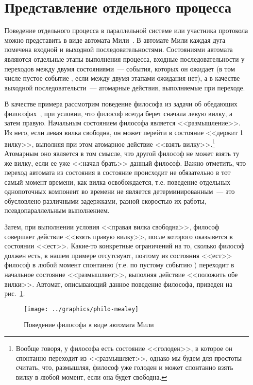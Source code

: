 \section{Представление отдельного процесса}
\label{sec:mealey-formalization}

Поведение отдельного процесса в параллельной системе или участника протокола можно
представить в виде автомата Мили~\cite{Velder}. В автомате Мили каждая дуга помечена
входной и выходной последовательностями. Состояниями автомата являются отдельные этапы
выполнения процесса, входные последовательности у переходов между двумя состояниями~---
события, которых он ожидает (в том числе пустое событие , если между двумя
этапами ожидания нет), а в качестве выходной последовательсти~--- атомарные действия,
выполняемые при переходе.

В качестве примера рассмотрим поведение философа из задачи об обедающих
философах~\cite{Dijkstra}, при условии, что философ всегда берет сначала левую вилку, а
затем правую. Начальным состоянием философа является <<размышление>>. Из него, если левая
вилка свободна, он может перейти в состояние <<держит 1 вилку>>, выполняя при этом
атомарное действие <<взять вилку>>.\footnote{Вообще говоря, у философа есть состояние
  <<голоден>>, в которое он спонтанно переходит из <<размышляет>>, однако мы будем для
  простоты считать, что, размышляя, философ уже голоден и может спонтанно взять вилку в
  любой момент, если она будет свободна.} Атомарным оно является в том смысле, что другой
философ не может взять ту же вилку, если ее уже <<начал брать>> данный философ. Важно
отметить, что переход автомата из состояния в состояние происходит не обязательно в тот
самый момент времени, как вилка освобождается, т.е. поведение отдельных однопоточных
компонент во времени не является детерминированным~--- это обусловлено различными
задержками, разной скоростью их работы, псевдопараллельным выполнением\etc.

Затем, при выполнении условия <<правая вилка свободна>>, философ совершает действие
<<взять правую вилку>>, после которого оказывется в состоянии <<ест>>. Какие-то конкретные
ограничений на то, сколько философ должен есть, в нашем примере отсутсвуют, поэтому из
состояния <<ест>> философ в любой момент спонтанно (т.е. по пустому событию )
переходит в начальное состояние <<размышляет>>, выполняя действие <<положить обе
вилки>>. Автомат, описывающий данное поведение философа, приведен на рис.~\ref{fig:philo-mealey}.

\begin{figure}[ht]
  \centering
  \texttt{[image: ../graphics/philo-mealey]}
  \caption{Поведение философа в виде автомата Мили}
  \label{fig:philo-mealey}
\end{figure}

